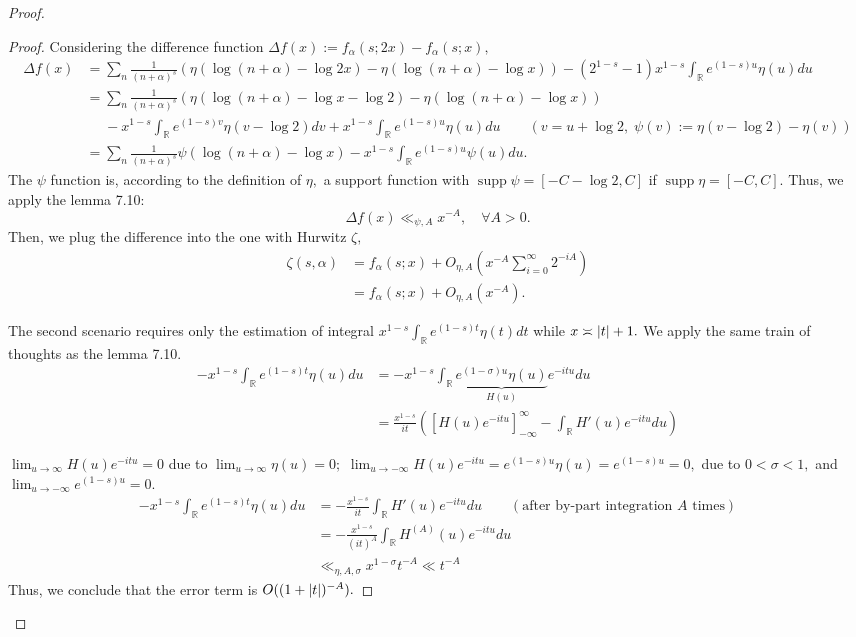 \begin{proof}
\begin{proof}
Considering the difference function $\Delta f(x) := f_\alpha(s; 2x) - f_\alpha(s; x),$
\begin{align*}
    \Delta f(x) &= \sum_n \frac{1}{(n+\alpha)^s} (\eta(\log (n + \alpha) - \log 2x) - \eta(\log (n + \alpha) - \log x)) - (2^{1-s}-1)x^{1-s} \int_{\mathbb{R}} e^{(1-s)u} \eta(u) du \\
    &= \sum_n \frac{1}{(n+\alpha)^s} (\eta(\log (n + \alpha) - \log x - \log 2) - \eta(\log (n + \alpha) - \log x)) \\ &\,\,\quad -x^{1-s} \int_{\mathbb{R}} e^{(1-s)v} \eta(v - \log 2) dv + x^{1-s} \int_{\mathbb{R}} e^{(1-s)u} \eta(u) du \qquad (v = u + \log 2,\; \psi(v) := \eta(v - \log 2) - \eta(v)) \\ 
    &= \sum_n \frac{1}{(n+\alpha)^s} \psi(\log (n + \alpha) - \log x) - x^{1-s} \int_{\mathbb{R}} e^{(1-s)u} \psi(u) du.
\end{align*}
The $\psi$ function is, according to the definition of $\eta,$ a support function with $\operatorname{supp} \psi = [-C-\log 2, C]$ if $\operatorname{supp} \eta = [-C, C].$ Thus, we apply the lemma 7.10:
\begin{equation*}
    \Delta f(x) \ll_{\psi, A} x^{-A}, \quad \forall A > 0.
\end{equation*}
Then, we plug the difference into the one with Hurwitz $\zeta,$
\begin{align*}
    \zeta(s, \alpha) &= f_\alpha(s; x) + O_{\eta,A} \left( x^{-A} \sum_{i = 0}^\infty 2^{-iA} \right) \\
    &= f_\alpha(s; x) + O_{\eta,A}(x^{-A}).
\end{align*}

The second scenario requires only the estimation of integral $x^{1-s} \int_{\mathbb{R}} e^{(1-s)t} \eta(t) dt$ while $x \asymp \left\lvert t \right\rvert + 1.$ We apply the same train of thoughts as the lemma 7.10.
\begin{align*}
    -x^{1-s} \int_{\mathbb{R}} e^{(1-s)t} \eta(u) du &= -x^{1-s} \int_{\mathbb{R}} \underbrace{e^{(1-\sigma)u} \eta(u)}_{H(u)} e^{-itu} du \\
    &= \frac{x^{1-s}}{it} \left( \left[ H(u)e^{-itu} \right]_{-\infty}^\infty - \int_\mathbb{R} H'(u) e^{-itu} du \right)
\end{align*}

$\lim_{u \to \infty} H(u)e^{-itu} = 0$ due to $\lim_{u \to \infty} \eta(u) = 0;$ $\lim_{u \to -\infty} H(u)e^{-itu} = e^{(1-s)u}\eta(u) = e^{(1-s)u} = 0,$ due to $0 < \sigma < 1,$ and $\lim_{u \to -\infty} e^{(1-s)u} = 0.$
\begin{align*}
    -x^{1-s} \int_{\mathbb{R}} e^{(1-s)t} \eta(u) du &= -\frac{x^{1-s}}{it} \int_\mathbb{R} H'(u) e^{-itu} du \qquad (\text{after by-part integration $A$ times}) \\
    &= -\frac{x^{1-s}}{(it)^A} \int_\mathbb{R} H^{(A)}(u) e^{-itu} du \\
    &\ll_{\eta, A, \sigma} x^{1-\sigma} t^{-A} \ll t^{-A} 
\end{align*}
Thus, we conclude that the error term is $O((1+\left\lvert t \right\rvert)^{-A}).$
\end{proof}


\end{proof}
